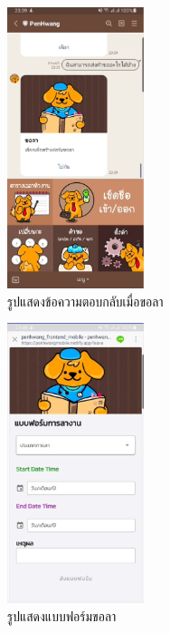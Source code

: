 \begin{figure}
  \begin{center}
    \includegraphics[width=4cm,keepaspectratio]{./images/message_leave.jpg}
  \end{center}
  \caption[รูปแสดงข้อความตอบกลับเมื่อขอลา]{รูปแสดงข้อความตอบกลับเมื่อขอลา} 
  \label{fig:message_leave}
\end{figure}
 
\begin{figure}
  \begin{center}
    \includegraphics[width=4cm,keepaspectratio]{./images/line_leave.jpg}
  \end{center}
  \caption[รูปแสดงแบบฟอร์มขอลา]{รูปแสดงแบบฟอร์มขอลา} 
  \label{fig:line_leave}
\end{figure}
 
